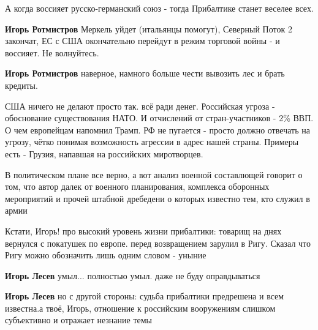 \begin{itemize}
\begin{itemize} %
А когда воссияет русско-германский союз - тогда Прибалтике станет веселее всех.

\textbf{Игорь Ротмистров} Меркель уйдет (итальянцы помогут), Северный Поток 2 закончат, ЕС с США окончательно перейдут в режим торговой войны - и воссияет.
Не волнуйтесь.

\textbf{Игорь Ротмистров} наверное, намного больше чести вывозить лес и брать кредиты.
\end{itemize} %


США ничего не делают просто так. всё ради денег. Российская угроза -
обоснование существования НАТО. И отчислений от стран-участников - 2\% ВВП. О
чем европейцам напомнил Трамп. РФ не пугается - просто должно отвечать на
угрозу, чётко понимая возможность агрессии в адрес нашей страны. Примеры есть -
Грузия, напавшая на российских миротворцев.


В политическом плане все верно, а вот анализ военной составлющей говорит о том,
что автор далек от военного планирования, комплекса оборонных мероприятий и
прочей штабной дребедени о которых известно тем, кто служил в армии


Кстати, Игорь! про высокий уровень жизни прибалтики: товарищ на днях вернулся с
покатушек по европе. перед возвращением зарулил в Ригу. Сказал что Ригу можно
обозначить лишь одним словом - уныние

\begin{itemize} %
\textbf{Игорь Лесев} умыл... полностью умыл. даже не буду оправдываться

\textbf{Игорь Лесев} но с другой стороны: судьба прибалтики предрешена и всем известна.а твоё, Игорь, отношение к российским вооружениям слишком субъективно и отражает незнание темы
\end{itemize} %

\end{itemize} %
